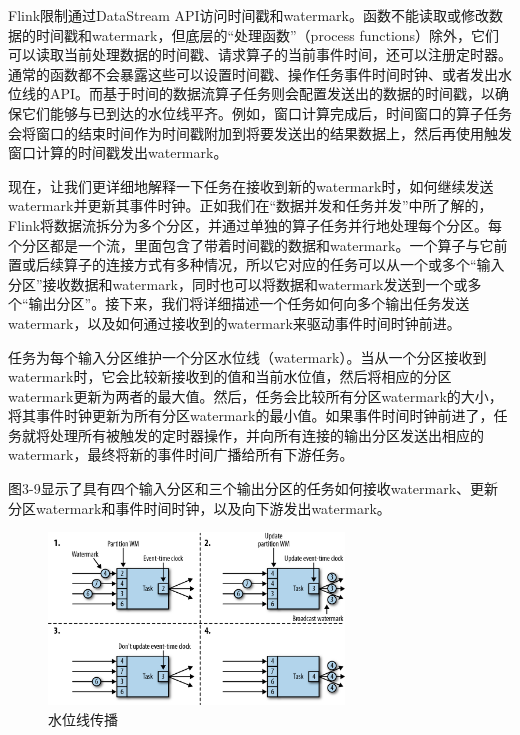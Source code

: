 \documentclass[cn,11pt,chinese]{elegantbook}
\begin{document}
\begin{note}
    Flink限制通过DataStream API访问时间戳和watermark。函数不能读取或修改数据的时间戳和watermark，但底层的“处理函数”（process functions）除外，它们可以读取当前处理数据的时间戳、请求算子的当前事件时间，还可以注册定时器。通常的函数都不会暴露这些可以设置时间戳、操作任务事件时间时钟、或者发出水位线的API。而基于时间的数据流算子任务则会配置发送出的数据的时间戳，以确保它们能够与已到达的水位线平齐。例如，窗口计算完成后，时间窗口的算子任务会将窗口的结束时间作为时间戳附加到将要发送出的结果数据上，然后再使用触发窗口计算的时间戳发出watermark。
\end{note}

现在，让我们更详细地解释一下任务在接收到新的watermark时，如何继续发送watermark并更新其事件时钟。正如我们在“数据并发和任务并发”中所了解的，Flink将数据流拆分为多个分区，并通过单独的算子任务并行地处理每个分区。每个分区都是一个流，里面包含了带着时间戳的数据和watermark。一个算子与它前置或后续算子的连接方式有多种情况，所以它对应的任务可以从一个或多个“输入分区”接收数据和watermark，同时也可以将数据和watermark发送到一个或多个“输出分区”。接下来，我们将详细描述一个任务如何向多个输出任务发送watermark，以及如何通过接收到的watermark来驱动事件时间时钟前进。

任务为每个输入分区维护一个分区水位线（watermark）。当从一个分区接收到watermark时，它会比较新接收到的值和当前水位值，然后将相应的分区watermark更新为两者的最大值。然后，任务会比较所有分区watermark的大小，将其事件时钟更新为所有分区watermark的最小值。如果事件时间时钟前进了，任务就将处理所有被触发的定时器操作，并向所有连接的输出分区发送出相应的watermark，最终将新的事件时间广播给所有下游任务。

图3-9显示了具有四个输入分区和三个输出分区的任务如何接收watermark、更新分区watermark和事件时间时钟，以及向下游发出watermark。

\begin{figure}[htbp]
    \centering
    \includegraphics[width=0.7\textwidth]{images/spaf_0309.png}
    \caption{水位线传播}
\end{figure}
\end{document}
